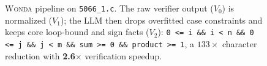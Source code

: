 \documentclass[10pt]{article}
\begin{document}
\begin{figure}[ht!]
\caption{\textsc{Wonda} pipeline on \texttt{5066\_1.c}. The raw verifier output ($V_0$) is normalized ($V_1$); the LLM then drops overfitted case constraints and keeps core loop-bound and sign facts ($V_2$): \texttt{0 <= i \&\& i < n \&\& 0 <= j \&\& j < m \&\& sum >= 0 \&\& product >= 1}, a $133\times$ character reduction with \textbf{2.6$\times$} verification speedup.}
\label{fig:pipeline_showcase_5066_1_c}
\end{figure}
\end{document}
